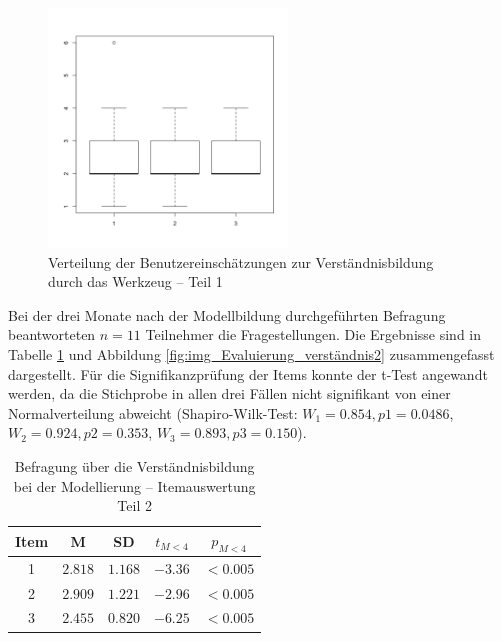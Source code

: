 \begin{figure}[htbp]
	\centering
		\includegraphics[height=2.5in]{img/Evaluierung/verstaendnis.png}
	\caption{Verteilung der Benutzereinschätzungen zur Verständnisbildung durch das Werkzeug -- Teil 1}
	\label{fig:img_Evaluierung_verständnis}
\end{figure}

Bei der drei Monate nach der Modellbildung durchgeführten Befragung beantworteten $n=11$ Teilnehmer die Fragestellungen. Die Ergebnisse sind in Tabelle \ref{tab:verständnis2} und Abbildung \ref{fig:img_Evaluierung_verständnis2} zusammengefasst dargestellt. Für die Signifikanzprüfung der Items konnte der t-Test angewandt werden, da die Stichprobe in allen drei Fällen nicht signifikant von einer Normalverteilung abweicht (Shapiro-Wilk-Test: $W_{1}=0.854, p{1}=0.0486$, $W_{2}=0.924, p{2}=0.353$, $W_{3}=0.893, p{3}=0.150$).

\begin{table}[htbp]
	\centering
	\caption{Befragung über die Verständnisbildung bei der Modellierung -- Itemauswertung Teil 2}

\begin{tabular}{| c || c | c || c | c |}
  \hline
   Item & M & SD & $t_{M<4}$ & $p_{M<4}$ \\ \hline
   1  & $2.818$ & $1.168$ & $-3.36$ & $<0.005$ \\ 
   2  & $2.909$ & $1.221$ & $-2.96$ & $<0.005$ \\ 
   3  & $2.455$ & $0.820$ & $-6.25$ & $<0.005$ \\ \hline
\end{tabular} \\ 
	\label{tab:verständnis2}
\end{table}

